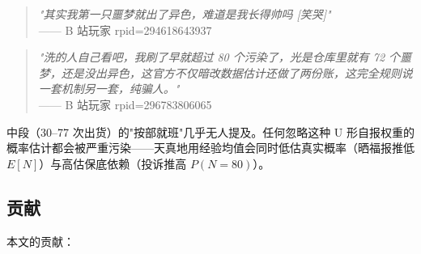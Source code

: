 \documentclass[journal]{IEEEtran}
\begin{document}
\begin{quote}
\textit{"其实我第一只噩梦就出了异色，难道是我长得帅吗 [笑哭]"}\\
\hfill —— B 站玩家 rpid=294618643937
\end{quote}

\begin{quote}
\textit{"洗的人自己看吧，我刷了早就超过 80 个污染了，光是仓库里就有 72 个噩梦，还是没出异色，这官方不仅暗改数据估计还做了两份账，这完全规则说一套机制另一套，纯骗人。"}\\
\hfill —— B 站玩家 rpid=296783806065
\end{quote}

中段（30--77 次出货）的"按部就班"几乎无人提及。任何忽略这种 U 形自报权重的概率估计都会被严重污染——天真地用经验均值会同时低估真实概率（晒福报推低 $E[N]$）与高估保底依赖（投诉推高 $P(N=80)$）。

\subsection{贡献}

本文的贡献：
\end{document}
